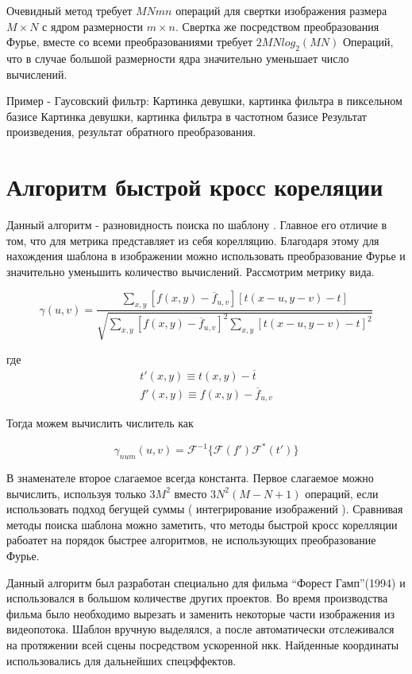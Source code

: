 \documentclass[oneside,final,14pt]{extreport}
\begin{document}
Очевидный метод требует $MNmn$ операций для свертки изображения размера $M\times N$ с ядром размерности $m\times n$. Свертка же посредством преобразования Фурье, вместе со всеми преобразованиями требует $2MNlog_2(MN)$ Операций, что в случае большой размерности ядра значительно уменьшает число вычислений. 

Пример - Гаусовский фильтр:
Картинка девушки, картинка фильтра в пиксельном базисе
Картинка девушки, картинка фильтра в частотном базисе
Результат произведения, результат обратного преобразования.

\section{Алгоритм быстрой  кросс кореляции}
Данный алгоритм  - разновидность поиска по шаблону \cite{Cross-Correlation}. Главное его отличие в том, что для метрика представляет из себя корелляцию. Благодаря этому для нахождения шаблона в изображении можно использовать преобразование Фурье и значительно уменьшить количество вычислений. 
Рассмотрим метрику вида.

\begin{equation}
\gamma(u,v)
=
\frac{
\sum_{x,y}
[f(x,y) - \overline{f}_{u,v}]
[t(x-u,y-v)-t]
}
{
\sqrt{
\sum_{x,y}
[f(x,y) - \overline{f}_{u,v}]^2
\sum_{x,y}
[t(x-u,y-v)-t]^2
}
} 
\end{equation}

где
\begin{gather*}
t'(x,y)
\equiv
t(x,y) - \overline{t}
\\
f'(x,y)
\equiv
f(x,y) - \overline{f}_{u,v}
\end{gather*}

Тогда можем вычислить числитель как

\begin{equation}
\gamma_{num}(u,v)
=
\mathcal{F}^{-1}
\{
\mathcal{F}(f')
\mathcal{F}^*(t')
\}
\end{equation}

В знаменателе второе слагаемое всегда константа. Первое слагаемое можно вычислить, используя только $3M^2$   вместо $3N^2(M-N+1)$ операций, если использовать подход бегущей суммы ( интегрирование изображений ). 
Сравнивая методы поиска шаблона можно заметить, что методы быстрой кросс корелляции рабоатет на порядок быстрее алгоритмов, не использующих преобразование Фурье. 

Данный алгоритм был разработан специально для фильма “Форест Гамп”(1994) и использовался в большом количестве других проектов. Во время производства фильма было необходимо вырезать и заменить некоторые части изображения из видеопотока. Шаблон вручную выделялся, а после автоматически отслеживался на протяжении всей сцены посредством ускоренной нкк. Найденные координаты использовались для дальнейших спецэффектов.
\end{document}
